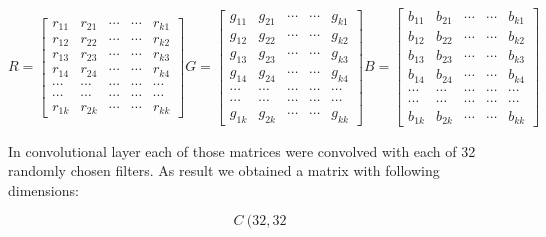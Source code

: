 \begin{equation}
R =
\left[
\begin{matrix}
r_{11} & r_{21} & \cdots & \cdots & r_{k1}\\
r_{12} & r_{22} & \cdots & \cdots & r_{k2}\\
r_{13} & r_{23} & \cdots & \cdots & r_{k3}\\
r_{14} & r_{24} & \cdots & \cdots & r_{k4}\\
\cdots & \cdots & \cdots & \cdots & \cdots\\
\cdots & \cdots & \cdots & \cdots & \cdots\\
r_{1k} & r_{2k} & \cdots & \cdots & r_{kk}
\end{matrix}
\right]
G =
\left[
\begin{matrix}
g_{11} & g_{21} & \cdots & \cdots & g_{k1}\\
g_{12} & g_{22} & \cdots & \cdots & g_{k2}\\
g_{13} & g_{23} & \cdots & \cdots & g_{k3}\\
g_{14} & g_{24} & \cdots & \cdots & g_{k4}\\
\cdots & \cdots & \cdots & \cdots & \cdots\\
\cdots & \cdots & \cdots & \cdots & \cdots\\
g_{1k} & g_{2k} & \cdots & \cdots & g_{kk}
\end{matrix}
\right]
B =
\left[
\begin{matrix}
b_{11} & b_{21} & \cdots & \cdots & b_{k1}\\
b_{12} & b_{22} & \cdots & \cdots & b_{k2}\\
b_{13} & b_{23} & \cdots & \cdots & b_{k3}\\
b_{14} & b_{24} & \cdots & \cdots & b_{k4}\\
\cdots & \cdots & \cdots & \cdots & \cdots\\
\cdots & \cdots & \cdots & \cdots & \cdots\\
b_{1k} & b_{2k} & \cdots & \cdots & b_{kk}
\end{matrix}
\right]
\end{equation}

In convolutional layer each of those matrices were convolved with each of 32 randomly chosen filters. As result we obtained a matrix with following dimensions: 

\begin{equation}
C ~ (32,32
\end{equation}



 

